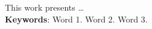 \begin{resumo}[ABSTRACT]
\begin{SingleSpacing}

This work presents \dots\\

\textbf{Keywords}: Word 1. Word 2. Word 3.

\end{SingleSpacing}
\end{resumo}
